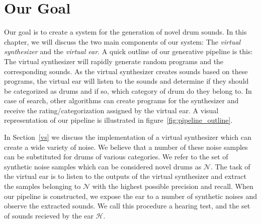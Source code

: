 \documentclass[\main/thesis.tex]{subfiles}
\begin{document}
\label{impl}
\section{Our Goal}
Our goal is to create a system for the generation of novel drum sounds. In this chapter, we will discuss the two main components of our system: The \textit{virtual synthesizer} and the \textit{virtual ear}. A quick outline of our generative pipeline is this: The virtual synthesizer will rapidly generate random programs and the corresponding sounds. As the virtual synthesizer creates sounds based on these programs, the virtual ear will listen to the sounds and determine if they should be categorized as drums and if so, which category of drum do they belong to. In case of search, other algorithms can create programs for the synthesizer and receive the rating/categorization assigned by the virtual ear. A visual representation of our pipeline is illustrated in  figure~\ref{fig:pipeline_outline}.

In Section~\ref{vs} we discuss the implementation of a virtual synthesizer which can create a wide variety of noise. We believe that a number of these noise samples can be substituted for drums of various categories. We refer to the set of synthetic noise samples which can be considered novel drums as $\mathcal{N}$. The task of the virtual ear is to listen to the outputs of the virtual synthesizer and extract the samples belonging to $\mathcal{N}$ with the highest possible precision and recall. When our pipeline is constructed, we expose the ear to a number of synthetic noises and observe the extracted sounds. We call this procedure a hearing test, and the set of sounds recieved by the ear $\mathcal{H}$. 
\end{document}
